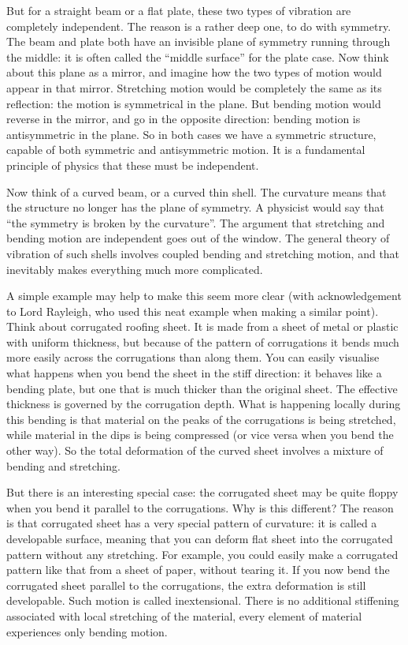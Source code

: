   But for a straight beam or a flat plate, these two types of vibration are 
  completely independent. The reason is a rather deep one, to do with symmetry. 
  The beam and plate both have an invisible plane of symmetry running through 
  the middle: it is often called the ``middle surface'' for the plate case. Now 
  think about this plane as a mirror, and imagine how the two types of motion 
  would appear in that mirror. Stretching motion would be completely the same 
  as its reflection: the motion is symmetrical in the plane. But bending motion 
  would reverse in the mirror, and go in the opposite direction: bending motion 
  is antisymmetric in the plane. So in both cases we have a symmetric 
  structure, capable of both symmetric and antisymmetric motion. It is a 
  fundamental principle of physics that these must be independent. 

  Now think of a curved beam, or a curved thin shell. The curvature means that 
  the structure no longer has the plane of symmetry. A physicist would say that 
  ``the symmetry is broken by the curvature''. The argument that stretching and 
  bending motion are independent goes out of the window. The general theory of 
  vibration of such shells involves coupled bending and stretching motion, and 
  that inevitably makes everything much more complicated. 

  A simple example may help to make this seem more clear (with acknowledgement 
  to Lord Rayleigh, who used this neat example when making a similar point). 
  Think about corrugated roofing sheet. It is made from a sheet of metal or 
  plastic with uniform thickness, but because of the pattern of corrugations it 
  bends much more easily across the corrugations than along them. You can 
  easily visualise what happens when you bend the sheet in the stiff direction: 
  it behaves like a bending plate, but one that is much thicker than the 
  original sheet. The effective thickness is governed by the corrugation depth. 
  What is happening locally during this bending is that material on the peaks 
  of the corrugations is being stretched, while material in the dips is being 
  compressed (or vice versa when you bend the other way). So the total 
  deformation of the curved sheet involves a mixture of bending and stretching. 

  But there is an interesting special case: the corrugated sheet may be quite 
  floppy when you bend it parallel to the corrugations. Why is this different? 
  The reason is that corrugated sheet has a very special pattern of curvature: 
  it is called a developable surface, meaning that you can deform flat sheet 
  into the corrugated pattern without any stretching. For example, you could 
  easily make a corrugated pattern like that from a sheet of paper, without 
  tearing it. If you now bend the corrugated sheet parallel to the 
  corrugations, the extra deformation is still developable. Such motion is 
  called inextensional. There is no additional stiffening associated with local 
  stretching of the material, every element of material experiences only 
  bending motion. 

